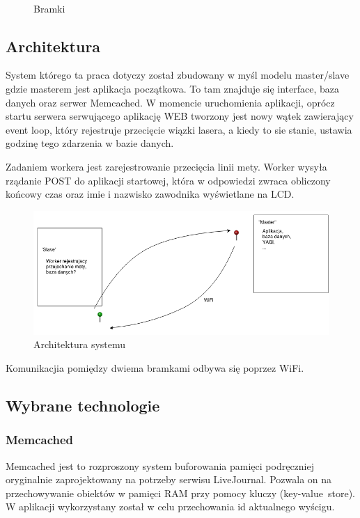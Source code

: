 \documentclass[11pt,a4paper, twoside]{article}
\begin{document}
\begin{figure}[H]
\begin{center}
\caption{Bramki}
$\label{both}$
\end{center}
\end{figure}

\newpage
\subsection{Architektura}
System którego ta praca dotyczy został zbudowany w myśl modelu master/slave gdzie masterem jest aplikacja początkowa. To tam znajduje się interface, baza danych oraz serwer Memcached. W momencie uruchomienia aplikacji, oprócz startu serwera serwującego aplikację WEB tworzony jest nowy wątek zawierający event loop, który rejestruje przecięcie wiązki lasera, a kiedy to sie stanie, ustawia godzinę tego zdarzenia w bazie danych.

Zadaniem workera jest zarejestrowanie przecięcia linii mety. Worker wysyła rządanie POST do aplikacji startowej, która w odpowiedzi zwraca obliczony końcowy czas oraz imie i nazwisko zawodnika wyświetlane na LCD.
\newline

\begin{figure}[ht]
\includegraphics[scale=0.5]{./img/asdasd.png}
\caption{Architektura systemu}
\end{figure}
\noindent
Komunikacjia pomiędzy dwiema bramkami odbywa się poprzez WiFi.
\subsection{Wybrane technologie}
\subsubsection{Memcached}
Memcached jest to rozproszony system buforowania pamięci podręczniej oryginalnie zaprojektowany na potrzeby serwisu  LiveJournal. Pozwala on na przechowywanie obiektów w pamięci RAM przy pomocy kluczy \mbox{(key-value store)}. W aplikacji wykorzystany został w celu przechowania id aktualnego wyścigu.
\end{document}
